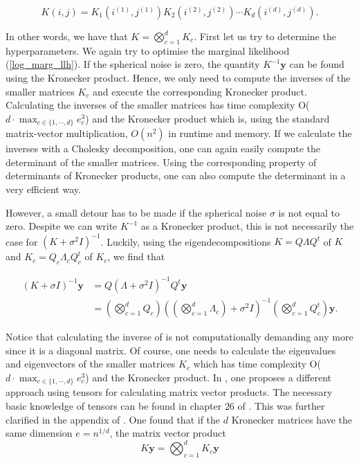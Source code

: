 \documentclass[12pt,a4paper,oneside]{book}
\begin{document}
\begin{equation}\label{Kronecker1}
K(i,j) = K_1(i^{(1)},j^{(1)})K_2(i^{(2)},j^{(2)}) \cdots K_d(i^{(d)},j^{(d)}). 
\end{equation}

In other words, we have that $K = \bigotimes_{c=1}^d K_c$. First let us try to determine the hyperparameters. We again try to optimise the marginal likelihood (\ref{log_marg_llh}). If the spherical noise is zero, the quantity $K^{-1} \bm{y}$ can be found using the Kronecker product. Hence, we only need to compute the inverses of the smaller matrices $K_c$ and execute the corresponding Kronecker product. Calculating the inverses of the smaller matrices has time complexity O($ d \cdot \max\nolimits_{c \in \{1,\cdots,d\}} e_c^3$) and the Kronecker product which is, using the standard matrix-vector multiplication, $O(n^2)$ in runtime and memory. If we calculate the inverses with a Cholesky decomposition, one can again easily compute the determinant of the smaller matrices. Using the corresponding property of determinants of Kronecker products, one can also compute the determinant in a very efficient way. 


However, a small detour has to be made if the spherical noise $\sigma$ is not equal to zero. Despite we can write $K^{-1}$ as a Kronecker product, this is not necessarily the case for $(K + \sigma^2 I)^{-1}$. Luckily, using the eigendecompositions $ K = Q \Lambda Q^t$ of $K$ and  $K_c = Q_c \Lambda_c Q_c^t$ of $K_c$, we find that 

\begin{align}
(K + \sigma I)^{-1} \bm{y} &= Q ( \Lambda + \sigma^2 I)^{-1} Q^t \bm{y} \nonumber \\ 
&= \left( \bigotimes\limits_{c=1}^d Q_c \right)  \left( \left(\bigotimes\limits_{c=1}^d \Lambda_c \right)  + \sigma^2 I \right)^{-1} \left( \bigotimes\limits_{c=1}^d Q^t_c \right) \bm{y}.
\end{align}

Notice that calculating the inverse of is not computationally demanding any more since it is a diagonal matrix. Of course, one needs to calculate the eigenvalues and eigenvectors of the smaller matrices $K_c$ which has time complexity O($ d \cdot \max\nolimits_{c \in \{1,\cdots,d\}} e_c^3$) and the Kronecker product. In \cite{saatcci2012scalable}, one proposes a different approach using tensors for calculating matrix vector products. The necessary basic knowledge of tensors can be found in chapter $26$ of \cite{riley2006mathematical}. This was further clarified in the appendix of \cite{wilson2014covariance}. One found that if the $d$ Kronecker matrices have the same dimension $e = n^{1/d}$, the matrix vector product 
\begin{equation}
K \bm{y} = \bigotimes_{c=1}^d K_c \bm{y}
\end{equation}
\end{document}
